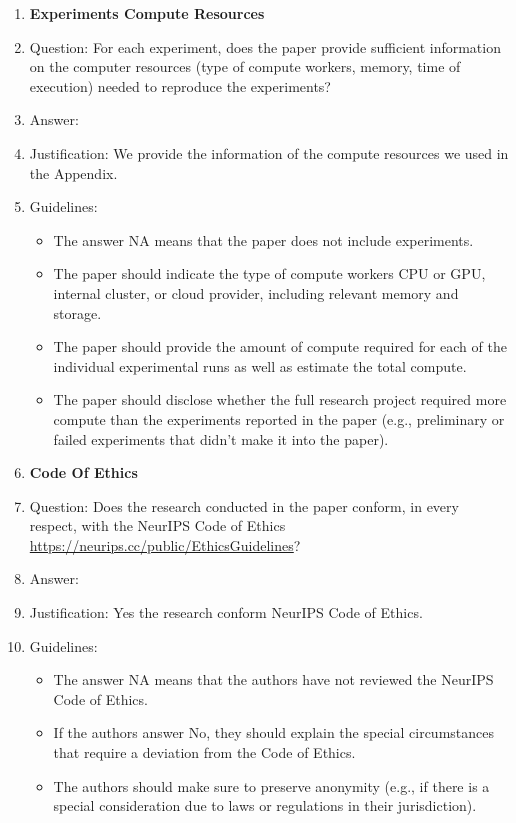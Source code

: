 \documentclass{article}
\begin{document}
\begin{enumerate}
\item {\bf Experiments Compute Resources}
    \item[] Question: For each experiment, does the paper provide sufficient information on the computer resources (type of compute workers, memory, time of execution) needed to reproduce the experiments?
    \item[] Answer: \answerYes{} %
    \item[] Justification: We provide the information of the compute resources we used in the Appendix.
    \item[] Guidelines:
    \begin{itemize}
        \item The answer NA means that the paper does not include experiments.
        \item The paper should indicate the type of compute workers CPU or GPU, internal cluster, or cloud provider, including relevant memory and storage.
        \item The paper should provide the amount of compute required for each of the individual experimental runs as well as estimate the total compute. 
        \item The paper should disclose whether the full research project required more compute than the experiments reported in the paper (e.g., preliminary or failed experiments that didn't make it into the paper). 
    \end{itemize}
    
\item {\bf Code Of Ethics}
    \item[] Question: Does the research conducted in the paper conform, in every respect, with the NeurIPS Code of Ethics \url{https://neurips.cc/public/EthicsGuidelines}?
    \item[] Answer: \answerYes{} %
    \item[] Justification: Yes the research conform NeurIPS Code of Ethics.
    \item[] Guidelines:
    \begin{itemize}
        \item The answer NA means that the authors have not reviewed the NeurIPS Code of Ethics.
        \item If the authors answer No, they should explain the special circumstances that require a deviation from the Code of Ethics.
        \item The authors should make sure to preserve anonymity (e.g., if there is a special consideration due to laws or regulations in their jurisdiction).
    \end{itemize}



\end{enumerate}
\end{document}
